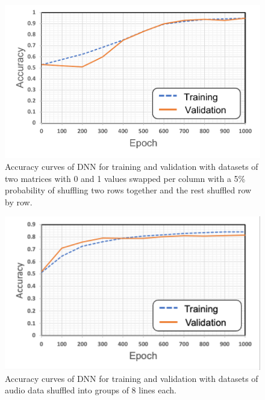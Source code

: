 \begin{figure}[t]
    \begin{center}
        \includegraphics[width=0.8\columnwidth]{figures/graph_stripe_1block95ratio.pdf}
    \end{center}
    \vspace{-8pt}
	\caption{Accuracy curves of DNN for training and validation with datasets of two matrices with 0 and 1 values swapped per column with a 5\% probability of shuffling two rows together and the rest shuffled row by row.}
	\label{fig:accu_stripe_1block95ratio}
\end{figure}

\begin{figure}[t]
    \begin{center}
        \includegraphics[width=0.8\columnwidth]{figures/inkscape_graph_audio_8block.pdf}
    \end{center}
    \vspace{-8pt}
	\caption{Accuracy curves of DNN for training and validation with datasets of audio data shuffled into groups of 8 lines each.}
	\label{fig:accu_audio_8block}
\end{figure}

